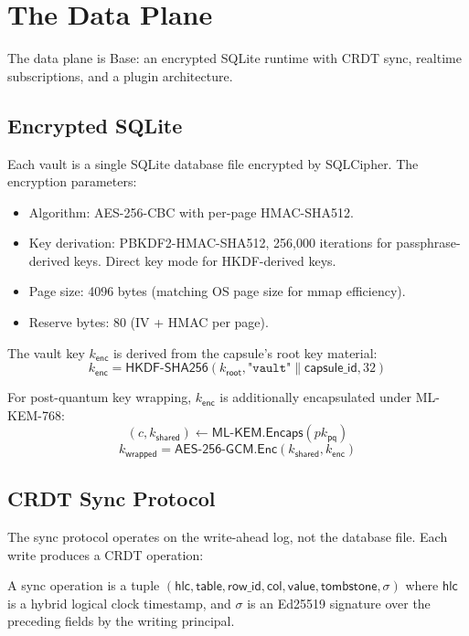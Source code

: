 \section{The Data Plane}
\label{sec:data}

The data plane is Base: an encrypted SQLite runtime with CRDT sync, realtime
subscriptions, and a plugin architecture.

\subsection{Encrypted SQLite}

Each vault is a single SQLite database file encrypted by SQLCipher. The
encryption parameters:

\begin{itemize}[nosep]
  \item Algorithm: AES-256-CBC with per-page HMAC-SHA512.
  \item Key derivation: PBKDF2-HMAC-SHA512, 256,000 iterations for
        passphrase-derived keys. Direct key mode for HKDF-derived keys.
  \item Page size: 4096 bytes (matching OS page size for mmap efficiency).
  \item Reserve bytes: 80 (IV + HMAC per page).
\end{itemize}

The vault key $k_{\mathsf{enc}}$ is derived from the capsule's root key material:
\[
  k_{\mathsf{enc}} = \mathsf{HKDF\text{-}SHA256}(k_{\mathsf{root}},
    \texttt{"vault"} \| \mathsf{capsule\_id}, 32)
\]

For post-quantum key wrapping, $k_{\mathsf{enc}}$ is additionally encapsulated
under ML-KEM-768:
\[
  (c, k_{\mathsf{shared}}) \leftarrow \mathsf{ML\text{-}KEM.Encaps}(pk_{\mathsf{pq}})
\]
\[
  k_{\mathsf{wrapped}} = \mathsf{AES\text{-}256\text{-}GCM.Enc}(k_{\mathsf{shared}},
    k_{\mathsf{enc}})
\]

\subsection{CRDT Sync Protocol}

The sync protocol operates on the write-ahead log, not the database file.
Each write produces a CRDT operation:

\begin{definition}\label{def:syncop}
A sync operation is a tuple $(\mathsf{hlc}, \mathsf{table}, \mathsf{row\_id},
\mathsf{col}, \mathsf{value}, \mathsf{tombstone}, \sigma)$ where $\mathsf{hlc}$
is a hybrid logical clock timestamp, and $\sigma$ is an Ed25519 signature over
the preceding fields by the writing principal.
\end{definition}

